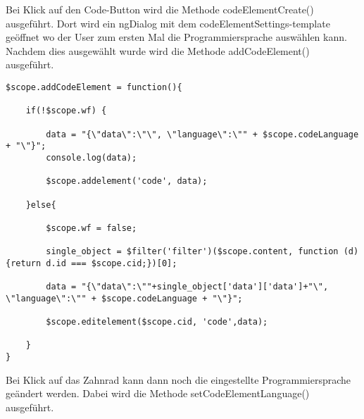 
Bei Klick auf den Code-Button wird die Methode codeElementCreate() ausgeführt. Dort wird ein ngDialog mit dem codeElementSettings-template geöffnet wo der User zum ersten Mal die Programmiersprache auswählen kann. Nachdem dies ausgewählt wurde wird die Methode addCodeElement() ausgeführt.

\begin{lstlisting}[caption={Code-Element Persistierung}]
$scope.addCodeElement = function(){

    if(!$scope.wf) {

        data = "{\"data\":\"\", \"language\":\"" + $scope.codeLanguage + "\"}";
        console.log(data);

        $scope.addelement('code', data);

    }else{

        $scope.wf = false;

        single_object = $filter('filter')($scope.content, function (d) {return d.id === $scope.cid;})[0];

        data = "{\"data\":\""+single_object['data']['data']+"\", \"language\":\"" + $scope.codeLanguage + "\"}";

        $scope.editelement($scope.cid, 'code',data);

    }
}
\end{lstlisting}

Bei Klick auf das Zahnrad kann dann noch die eingestellte Programmiersprache geändert werden. Dabei wird die Methode setCodeElementLanguage() ausgeführt.
